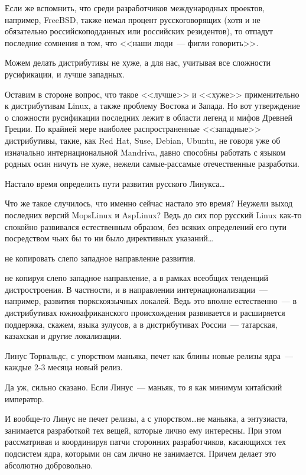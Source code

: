 Если же вспомнить, что среди разработчиков международных проектов, например, FreeBSD, также немал процент русскоговорящих (хотя и не обязательно российскоподданных или российских резидентов), то отпадут последние сомнения в том, что <<наши люди~--- фигли говорить>>. 
\begin{shadequote}{}
Можем делать дистрибутивы не хуже, а для нас, учитывая все сложности русификации, и лучше западных.
\end{shadequote}
Оставим в стороне вопрос, что такое <<лучше>> и <<хуже>> применительно к дистрибутивам Linux, а также проблему Востока и Запада. Но вот утверждение о сложности русификации последних лежит в области легенд и мифов Древней Греции. По крайней мере наиболее распространенные <<западные>> дистрибутивы, такие, как Red Hat, Suse, Debian, Ubuntu, не говоря уже об изначально интернациональной Mandriva, давно способны работать с языком родных осин ничуть не хуже, нежели самые-рассамые отечественные разработки. 
\begin{shadequote}{}
Настало время определить пути развития русского Линукса\dots
\end{shadequote}
Что же такое случилось, что именно сейчас настало это время? Неужели выход последних версий MopsLinux и AspLinux? Ведь до сих пор русский Linux как-то спокойно развивался естественным образом, без всяких определений его пути посредством чьих бы то ни было директивных указаний\dots 
\begin{shadequote}{}
 не копировать слепо западное направление развития.
\end{shadequote}
 не копируя слепо западное направление, а в рамках всеобщих тенденций дистростроения. В частности, и в направлении интернационализации~--- например, развития тюркскоязычных локалей. Ведь это вполне естественно~--- в дистрибутивах южноафриканского происхождения развивается и расширяется поддержка, скажем, языка зулусов, а в дистрибутивах России~--- татарская, казахская и другие локализации. 
\begin{shadequote}{}
Линус Торвальдс, с упорством маньяка, печет как блины новые релизы ядра~--- каждые 2-3 месяца новый релиз.
\end{shadequote}
Да уж, сильно сказано. Если Линус~--- маньяк, то я как минимум китайский император. 

И вообще-то Линус не печет релизы, а с упорством\dots не маньяка, а энтузиаста, занимается разработкой тех вещей, которые лично ему интересны. При этом рассматривая и координируя патчи сторонних разработчиков, касающихся тех подсистем ядра, которыми он сам лично не занимается. Причем делает это абсолютно добровольно. 


